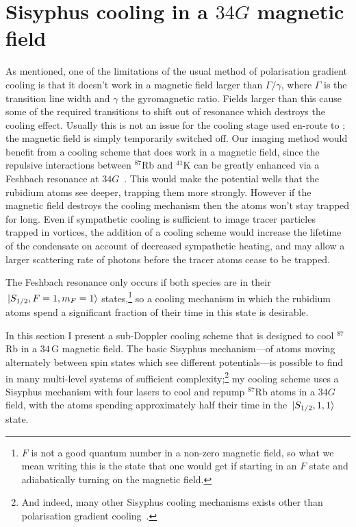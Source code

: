 \section{Sisyphus cooling in a $34\unit{G}$ magnetic field}\label{sec:laser_cooling_simulations}

As mentioned, one of the limitations of the usual method of polarisation gradient cooling is that it doesn't work in a magnetic field larger than $\Gamma/\gamma$, where $\Gamma$ is the transition line width and $\gamma$ the gyromagnetic ratio. Fields larger than this cause some of the required transitions to shift out of resonance which destroys the cooling effect. Usually this is not an issue for the cooling stage used en-route to \bec; the magnetic field is simply temporarily switched off. Our imaging method would benefit from a cooling scheme that does work in a magnetic field, since the repulsive interactions between $^{87}$Rb and $^{41}$K can be greatly enhanced via a Feshbach resonance at $34 \unit{G}$~\cite{thalhammer_double_2008}. This would make the potential wells that the rubidium atoms see deeper, trapping them more strongly. However if the magnetic field destroys the cooling mechanism then the atoms won't stay trapped for long. Even if sympathetic cooling is sufficient to image tracer particles trapped in vortices, the addition of a cooling scheme would increase the lifetime of the condensate on account of decreased sympathetic heating, and may allow a larger scattering rate of photons before the tracer atoms cease to be trapped.

The Feshbach resonance only occurs if both species are in their \mbox{$\ket{S_{1/2}, F=1,m_F=1}$} states,\footnote{$F$ is not a good quantum number in a non-zero magnetic field, so what we mean writing this is the state that one would get if starting in an $F$ state and adiabatically turning on the magnetic field.} so a cooling mechanism in which the rubidium atoms spend a significant fraction of their time in this state is desirable.

In this section I present a sub-Doppler cooling scheme that is designed to cool $^{87}$Rb in a $34\,$G magnetic field. The basic Sisyphus mechanism---of atoms moving alternately between spin states which see different potentials---is possible to find in many multi-level systems of sufficient complexity;\footnote{And indeed, many other Sisyphus cooling mechanisms exists other than polarisation gradient cooling~\cite[p 116]{metcalf_laser_1999}.} my cooling scheme uses a Sisyphus mechanism with four lasers to cool and repump $^{87}$Rb atoms in a $34\unit{G}$ field, with the atoms spending approximately half their time in the \mbox{$\ket{S_{1/2}, 1,1}$} state.

